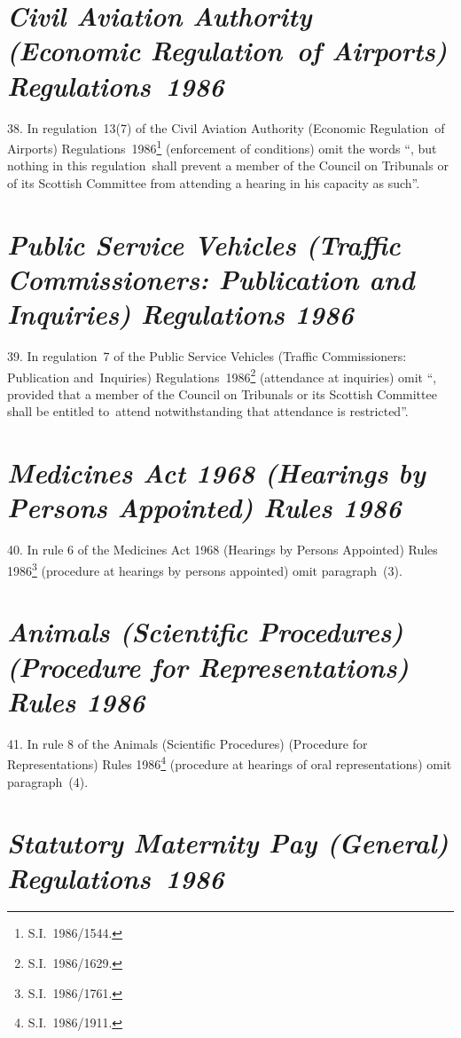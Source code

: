 \documentclass[12pt,a4paper]{article}
\begin{document}
\section*{\itshape Civil Aviation Authority (Economic Regulation~of Airports) Regulations~1986}

38.  In regulation~13(7) of the Civil Aviation Authority (Economic Regulation~of Airports) Regulations~1986\footnote{S.I.~1986/1544.} (enforcement of conditions) omit the words “, but nothing in this regulation~shall prevent a member of the Council on Tribunals or of its Scottish Committee from attending a hearing in his capacity as such”.

\enlargethispage{-4\baselineskip}

\section*{\itshape Public Service Vehicles (Traffic Commissioners: Publication and Inquiries) Regulations 1986}

39.  In regulation~7 of the Public Service Vehicles (Traffic Commissioners: Publication and~Inquiries) Regulations~1986\footnote{S.I.~1986/1629.} (attendance at inquiries) omit “, provided that a member of the Council on Tribunals or its Scottish Committee shall be entitled to~attend notwithstanding that attendance is restricted”.

\section*{\itshape\sloppy Medicines Act 1968 (Hearings by Persons Appointed) Rules 1986}

40.  In rule 6 of the Medicines Act 1968 (Hearings by Persons Appointed) Rules 1986\footnote{S.I.~1986/1761.} (procedure at hearings by persons appointed) omit paragraph~(3).

\section*{\itshape\sloppy Animals (Scientific Procedures) (Procedure for Representations) Rules 1986}

41.  In rule 8 of the Animals (Scientific Procedures) (Procedure for Representations) Rules 1986\footnote{S.I.~1986/1911.} (procedure at hearings of oral representations) omit paragraph~(4).

\section*{\itshape Statutory Maternity Pay (General) Regulations~1986}
\end{document}
